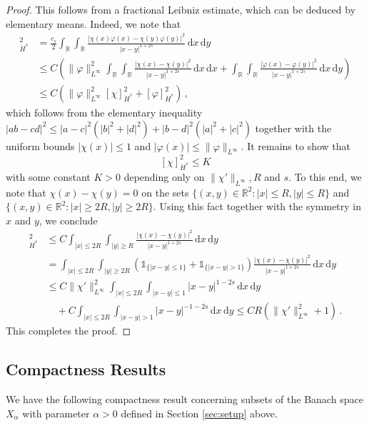 \documentclass[reqno,10pt,a4paper]{amsart}
\theoremstyle{definition}
\theoremstyle{definition}
\theoremstyle{remark}
\theoremstyle{remark}
\numberwithin{equation}{section}
\newcommand{\R}{\mathbb{R}}
\renewcommand{\phi}{\varphi}
\newcommand{\df}{\mathrm{d}}
\begin{document}
\begin{appendix}
\begin{proof}
This follows from a fractional Leibniz estimate, which can be deduced by elementary means. Indeed, we note that
\begin{align*}
[\chi \phi ]^2_{\dot{H}^s} & = \frac{c_s}{2} \int_\R \! \int_\R \frac{|\chi(x) \phi(x)- \chi(y) \phi(y)|^2}{|x-y|^{1+2s}} \, \df x \, \df y \\
& \leq C  \left (  \| \phi \|_{L^\infty}^2  \int_\R \! \int_\R \frac{|\chi(x)-\chi(y)|^2}{|x-y|^{1+2s}} \, \df x \, \df x + \int_\R \! \int_\R \frac{|\phi(x)-\phi(y)|^2}{|x-y|^{1+2s}} \, \df x \, \df y \right ) \\
& \leq C \left ( \| \phi \|_{L^\infty}^2 [\chi]_{\dot{H}^s}^2 + [\phi]_{\dot{H}^s}^2 \right ) \, , 
\end{align*}
which follows from the elementary inequality $|ab-cd|^2 \leq |a-c|^2 (|b|^2 + |d|^2) + |b-d|^2(|a|^2 + |c|^2)$ together with the uniform bounds $|\chi(x)| \leq 1$ and $|\phi(x)| \leq \| \phi \|_{L^\infty}$. It remains to show that
$$
[\chi]_{\dot{H}^s}^2 \leq K
$$
with some constant $K>0$ depending only on $\| \chi' \|_{L^\infty}, R$ and $s$. To this end, we note that $\chi(x)-\chi(y) = 0$ on the sets $\{ (x,y) \in \R^2 : |x| \leq R, |y| \leq R\}$ and $\{ (x,y) \in \R^2 : |x| \geq 2R, |y| \geq 2 R\}$. Using this fact together with the symmetry in $x$ and $y$, we conclude
\begin{align*}
[\chi]_{\dot{H}^s}^2 & \leq C \int_{|x| \leq 2 R} \int_{|y| \geq R} \frac{|\chi(x)-\chi(y)|^2}{|x-y|^{1+2s}} \, \df x \, \df y \\
& = \int_{|x| \leq 2R} \int_{|y| \geq 2R} ( \mathds{1}_{\{ |x-y| \leq 1\} } + \mathds{1}_{\{ |x-y| > 1\} } ) \frac{|\chi(x)-\chi(y)|^2}{|x-y|^{1+2s}} \, \df x \, \df y \\
& \leq C \|\chi'\|_{L^\infty}^2 \int_{|x| \leq 2 R} \int_{|x-y| \leq 1} |x-y|^{1-2s} \, \df x \, \df y  \\
& \quad + C \int_{|x| \leq 2R} \int_{|x-y| > 1} |x-y|^{-1-2s} \, \df x \, \df y \leq C R (\| \chi' \|_{L^\infty}^2 +1) \, .
\end{align*}
This completes the proof.
\end{proof}

\subsection{Compactness Results}

We have the following compactness result concerning subsets of the Banach space $X_\alpha$ with parameter $\alpha >0$ defined in Section \ref{sec:setup} above.
 

\end{appendix}
\end{document}
